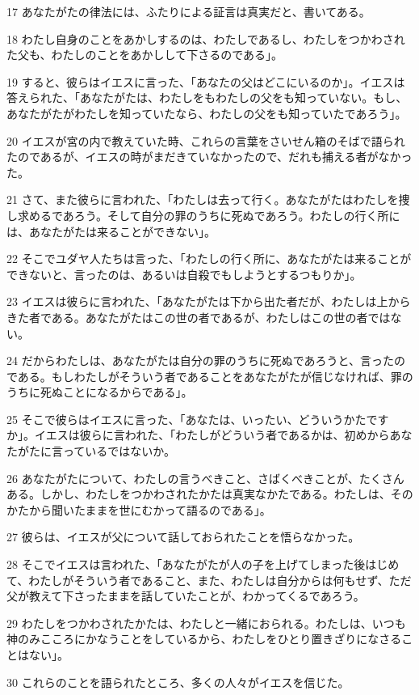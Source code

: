 \par 17 あなたがたの律法には、ふたりによる証言は真実だと、書いてある。
\par 18 わたし自身のことをあかしするのは、わたしであるし、わたしをつかわされた父も、わたしのことをあかしして下さるのである」。
\par 19 すると、彼らはイエスに言った、「あなたの父はどこにいるのか」。イエスは答えられた、「あなたがたは、わたしをもわたしの父をも知っていない。もし、あなたがたがわたしを知っていたなら、わたしの父をも知っていたであろう」。
\par 20 イエスが宮の内で教えていた時、これらの言葉をさいせん箱のそばで語られたのであるが、イエスの時がまだきていなかったので、だれも捕える者がなかった。
\par 21 さて、また彼らに言われた、「わたしは去って行く。あなたがたはわたしを捜し求めるであろう。そして自分の罪のうちに死ぬであろう。わたしの行く所には、あなたがたは来ることができない」。
\par 22 そこでユダヤ人たちは言った、「わたしの行く所に、あなたがたは来ることができないと、言ったのは、あるいは自殺でもしようとするつもりか」。
\par 23 イエスは彼らに言われた、「あなたがたは下から出た者だが、わたしは上からきた者である。あなたがたはこの世の者であるが、わたしはこの世の者ではない。
\par 24 だからわたしは、あなたがたは自分の罪のうちに死ぬであろうと、言ったのである。もしわたしがそういう者であることをあなたがたが信じなければ、罪のうちに死ぬことになるからである」。
\par 25 そこで彼らはイエスに言った、「あなたは、いったい、どういうかたですか」。イエスは彼らに言われた、「わたしがどういう者であるかは、初めからあなたがたに言っているではないか。
\par 26 あなたがたについて、わたしの言うべきこと、さばくべきことが、たくさんある。しかし、わたしをつかわされたかたは真実なかたである。わたしは、そのかたから聞いたままを世にむかって語るのである」。
\par 27 彼らは、イエスが父について話しておられたことを悟らなかった。
\par 28 そこでイエスは言われた、「あなたがたが人の子を上げてしまった後はじめて、わたしがそういう者であること、また、わたしは自分からは何もせず、ただ父が教えて下さったままを話していたことが、わかってくるであろう。
\par 29 わたしをつかわされたかたは、わたしと一緒におられる。わたしは、いつも神のみこころにかなうことをしているから、わたしをひとり置きざりになさることはない」。
\par 30 これらのことを語られたところ、多くの人々がイエスを信じた。
